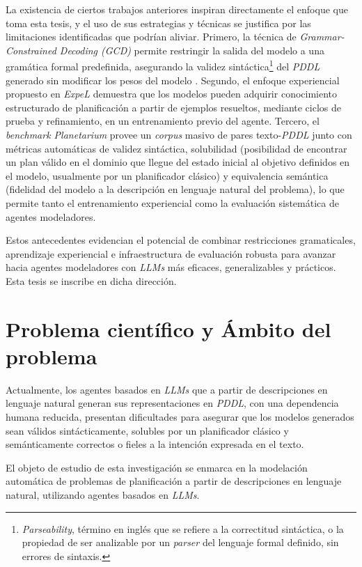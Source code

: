 La existencia de ciertos trabajos anteriores inspiran directamente el enfoque que toma esta tesis, y el uso de sus estrategias y técnicas se justifica por las limitaciones identificadas que podrían aliviar. Primero, la técnica de \textit{Grammar-Constrained Decoding (GCD)} permite restringir la salida del modelo a una gramática formal predefinida, asegurando la validez sintáctica\footnote{\textit{Parseability}, término en inglés que se refiere a la correctitud sintáctica, o la propiedad de ser analizable por un \textit{parser} del lenguaje formal definido, sin errores de sintaxis.} del \textit{PDDL} generado sin modificar los pesos del modelo \parencite{geng2023grammar}. Segundo, el enfoque experiencial propuesto en \textit{ExpeL} \parencite{zhao2024expel} demuestra que los modelos pueden adquirir conocimiento estructurado de planificación a partir de ejemplos resueltos, mediante ciclos de prueba y refinamiento, en un entrenamiento previo del agente. Tercero, el \textit{benchmark Planetarium} \parencite{zuo2024planetarium} provee un \textit{corpus} masivo de pares texto-\textit{PDDL} junto con métricas automáticas de validez sintáctica, solubilidad (posibilidad de encontrar un plan válido en el dominio que llegue del estado inicial al objetivo definidos en el modelo, usualmente por un planificador clásico) y equivalencia semántica (fidelidad del modelo a la descripción en lenguaje natural del problema), lo que permite tanto el entrenamiento experiencial como la evaluación sistemática de agentes modeladores.

Estos antecedentes evidencian el potencial de combinar restricciones gramaticales, aprendizaje experiencial e infraestructura de evaluación robusta para avanzar hacia agentes modeladores con \textit{LLMs} más eficaces, generalizables y prácticos. Esta tesis se inscribe en dicha dirección.

\section*{Problema científico y Ámbito del problema}

Actualmente, los agentes basados en \textit{LLMs} que a partir de descripciones en lenguaje natural generan sus representaciones en \textit{PDDL}, con una dependencia humana reducida, presentan dificultades para asegurar que los modelos generados sean válidos sintácticamente, solubles por un planificador clásico y semánticamente correctos o fieles a la intención expresada en el texto.

El objeto de estudio de esta investigación se enmarca en la modelación automática de problemas de planificación a partir de descripciones en lenguaje natural, utilizando agentes basados en \textit{LLMs}.

